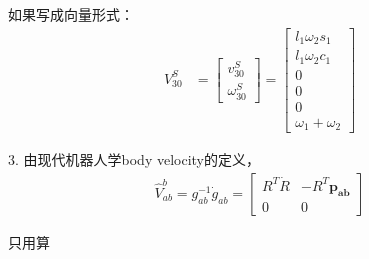 \documentclass{ctexart}
\begin{document}
如果写成向量形式：
\begin{equation*}
	\begin{aligned}
		V^S_{30} &=\begin{bmatrix}
			v_{30}^S \\
			\omega_{30}^S
		\end{bmatrix} =
		\begin{bmatrix}
			l_1\omega_2s_1 \\
			l_1\omega_2c_1 \\
			0 \\
			0\\
			0 \\
			\omega_1+\omega_2 
		\end{bmatrix}
	\end{aligned}
\end{equation*}

3. 由现代机器人学body velocity的定义，
\begin{equation*}
	\begin{aligned}
		\hat{V}^b_{ab}=g_{ab}^{-1} \dot{g}_{ab} = \begin{bmatrix}
			R^T\dot{R} & -R^T\boldsymbol{p_{ab}} \\
			0 & 0
		\end{bmatrix}
	\end{aligned}
\end{equation*}

只用算
\end{document}
